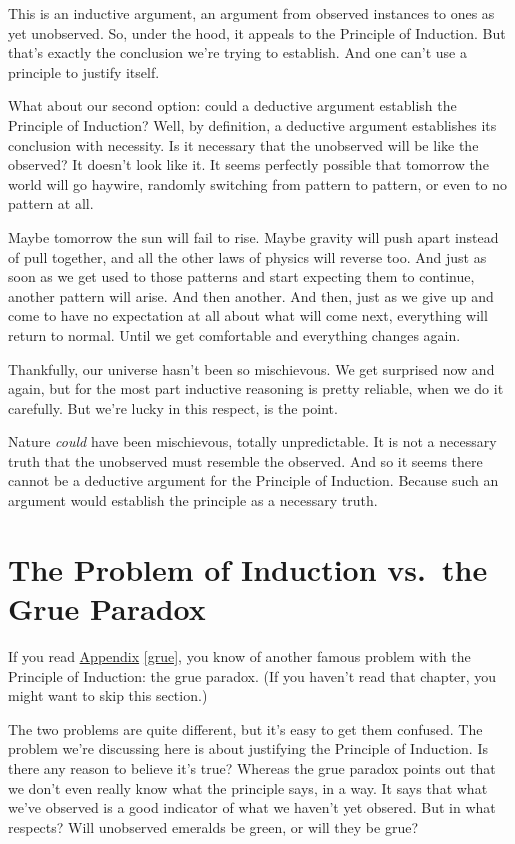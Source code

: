 \documentclass[justified]{tufte-book}
\begin{document}
This is an inductive argument, an argument from observed instances to ones as yet unobserved. So, under the hood, it appeals to the Principle of Induction. But that's exactly the conclusion we're trying to establish. And one can't use a principle to justify itself.

What about our second option: could a deductive argument establish the Principle of Induction? Well, by definition, a deductive argument establishes its conclusion with necessity. Is it necessary that the unobserved will be like the observed? It doesn't look like it. It seems perfectly possible that tomorrow the world will go haywire, randomly switching from pattern to pattern, or even to no pattern at all.

Maybe tomorrow the sun will fail to rise. Maybe gravity will push apart instead of pull together, and all the other laws of physics will reverse too. And just as soon as we get used to those patterns and start expecting them to continue, another pattern will arise. And then another. And then, just as we give up and come to have no expectation at all about what will come next, everything will return to normal. Until we get comfortable and everything changes again.

Thankfully, our universe hasn't been so mischievous. We get surprised now and again, but for the most part inductive reasoning is pretty reliable, when we do it carefully. But we're lucky in this respect, is the point.

Nature \emph{could} have been mischievous, totally unpredictable. It is not a necessary truth that the unobserved must resemble the observed. And so it seems there cannot be a deductive argument for the Principle of Induction. Because such an argument would establish the principle as a necessary truth.

\hypertarget{the-problem-of-induction-vs.-the-grue-paradox}{%
\section*{The Problem of Induction vs.~the Grue Paradox}\label{the-problem-of-induction-vs.-the-grue-paradox}}

If you read \protect\hyperlink{grue}{Appendix} \ref{grue}, you know of another famous problem with the Principle of Induction: the grue paradox. (If you haven't read that chapter, you might want to skip this section.)

The two problems are quite different, but it's easy to get them confused. The problem we're discussing here is about justifying the Principle of Induction. Is there any reason to believe it's true? Whereas the grue paradox points out that we don't even really know what the principle says, in a way. It says that what we've observed is a good indicator of what we haven't yet obsered. But in what respects? Will unobserved emeralds be green, or will they be grue?
\end{document}
